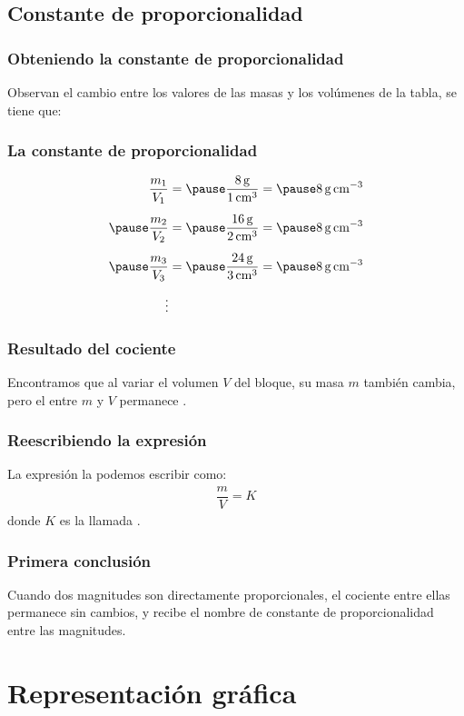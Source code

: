 \documentclass[14pt]{beamer}
\begin{document}
\subsection{Constante de proporcionalidad}

\begin{frame}
\frametitle{Obteniendo la constante de proporcionalidad}
Observan el cambio entre los valores de las masas y los volúmenes de la tabla, se tiene que:
\end{frame}
\begin{frame}
\frametitle{La constante de proporcionalidad}
\vspace*{-0.5cm}
\begin{eqnarray*}
\begin{aligned}
\dfrac{m_{1}}{V_{1}} &= \pause \dfrac{\SI{8}{\gram}}{\SI{1}{\cubic\centi\meter}} = \pause \SI{8}{\gram\per\cubic\centi\meter} \\[0.5em] \pause
\dfrac{m_{2}}{V_{2}} &= \pause \dfrac{\SI{16}{\gram}}{\SI{2}{\cubic\centi\meter}} = \pause \SI{8}{\gram\per\cubic\centi\meter} \\[0.5em] \pause
\dfrac{m_{3}}{V_{3}} &= \pause \dfrac{\SI{24}{\gram}}{\SI{3}{\cubic\centi\meter}} = \pause \SI{8}{\gram\per\cubic\centi\meter} \\[0.5em]
\vdots
\end{aligned}
\end{eqnarray*}
\end{frame}
\begin{frame}
\frametitle{Resultado del cociente}
Encontramos que al variar el volumen $V$ del bloque, su masa $m$ también cambia, \pause pero el  entre $m$ y $V$ permanece .
\end{frame}
\begin{frame}
\frametitle{Reescribiendo la expresión}
La expresión la podemos escribir como:
\pause
\begin{align*}
\dfrac{m}{V} = K
\end{align*}
donde $K$ es la llamada .
\end{frame}
\begin{frame}
\frametitle{Primera conclusión}
Cuando dos magnitudes son directamente proporcionales, el cociente entre ellas permanece sin cambios, y recibe el nombre de constante de proporcionalidad entre las magnitudes.
\end{frame}

\section{Representación gráfica}
\end{document}
